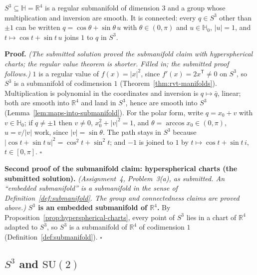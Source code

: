 \documentclass[11pt]{report}
\makeatletter
\newcounter{thmcounter}[section]
\renewenvironment{proof}[1][Proof]{\noindent\textbf{#1.} }{\hfill$\square$\par\vspace{5pt}}
\newcommand{\thmlabel}[1]{\edef\@currentlabel{\arabic{section}.\arabic{thmcounter}}\label{#1}}
\makeatother
\begin{document}
\begin{propbox}\thmlabel{prop:s3-lie-group}
$S^3 \subseteq \mathbb{H} = \mathbb{R}^4$ is a regular submanifold of dimension $3$ and a group whose multiplication and inversion are smooth. It is connected: every $q \in S^3$ other than $\pm 1$ can be written $q = \cos\theta + \sin\theta\, u$ with $\theta \in (0, \pi)$ and $u \in \mathbb{H}_0$, $|u| = 1$, and $t \mapsto \cos t + \sin t\, u$ joins $1$ to $q$ in $S^3$.
\end{propbox}

\begin{proof}
\textit{(The submitted solution proved the submanifold claim with hyperspherical charts; the regular value theorem is shorter. Filled in; the submitted proof follows.)} $1$ is a regular value of $f(x) = |x|^2$, since $f'(x) = 2x^{\mathsf T} \neq 0$ on $S^3$, so $S^3$ is a submanifold of codimension $1$ (Theorem~\ref{thm:rvt-manifolds}). Multiplication is polynomial in the coordinates and inversion is $q \mapsto \bar q$, linear; both are smooth into $\mathbb{R}^4$ and land in $S^3$, hence are smooth into $S^3$ (Lemma~\ref{lem:maps-into-submanifold}). For the polar form, write $q = x_0 + v$ with $v \in \mathbb{H}_0$; if $q \neq \pm 1$ then $v \neq 0$, $x_0^2 + |v|^2 = 1$, and $\theta = \arccos x_0 \in (0, \pi)$, $u = v/|v|$ work, since $|v| = \sin\theta$. The path stays in $S^3$ because $|\cos t + \sin t\, u|^2 = \cos^2 t + \sin^2 t$; and $-1$ is joined to $1$ by $t \mapsto \cos t + \sin t\, i$, $t \in [0, \pi]$.
\end{proof}

\begin{proof}[Second proof of the submanifold claim: hyperspherical charts (the submitted solution)]
\textit{(Assignment~4, Problem~3(a), as submitted. An ``embedded submanifold'' is a submanifold in the sense of Definition~\ref{def:submanifold}. The group and connectedness claims are proved above.)} \textbf{$S^3$ is an embedded submanifold of $\mathbb{R}^4$.} By Proposition~\ref{prop:hyperspherical-charts}, every point of $S^3$ lies in a chart of $\mathbb{R}^4$ adapted to $S^3$, so $S^3$ is a submanifold of $\mathbb{R}^4$ of codimension $1$ (Definition~\ref{def:submanifold}).
\end{proof}

\subsection{\texorpdfstring{$S^3$ and $\mathrm{SU}(2)$}{S3 and SU(2)}}\label{sub:s3-su2}
\end{document}

